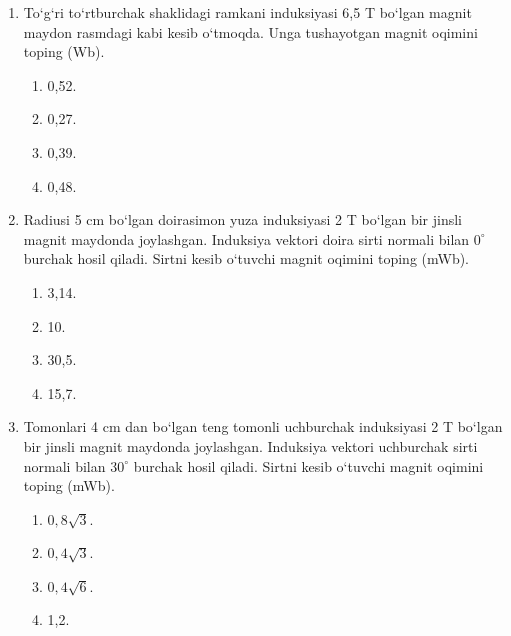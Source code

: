 \begin{enumerate}
\item To‘g‘ri to‘rtburchak shaklidagi ramkani induksiyasi 6,5 T bo‘lgan magnit maydon rasmdagi kabi kesib o‘tmoqda. Unga tushayotgan magnit oqimini toping (Wb).



\begin{enumerate}[label=\Alph*)]
\item 0,52.
\item 0,27.
\item 0,39.
\item 0,48.
\end{enumerate}

\item Radiusi 5 cm bo‘lgan doirasimon yuza induksiyasi 2 T bo‘lgan bir jinsli magnit maydonda joylashgan. Induksiya vektori doira sirti normali bilan $0^\circ$ burchak hosil qiladi. Sirtni kesib o‘tuvchi magnit oqimini toping (mWb).
\begin{enumerate}[label=\Alph*)]
\item 3,14.
\item 10.
\item 30,5.
\item 15,7.
\end{enumerate}

\item Tomonlari 4 cm dan bo‘lgan teng tomonli uchburchak induksiyasi 2 T bo‘lgan bir jinsli magnit maydonda joylashgan. Induksiya vektori uchburchak sirti normali bilan $30^\circ$ burchak hosil qiladi. Sirtni kesib o‘tuvchi magnit oqimini toping (mWb). 
\begin{enumerate}[label=\Alph*)]
\item $0,8\sqrt{3}$.
\item $0,4\sqrt{3}$.
\item $0,4\sqrt{6}$.
\item 1,2.
\end{enumerate}


\end{enumerate}
